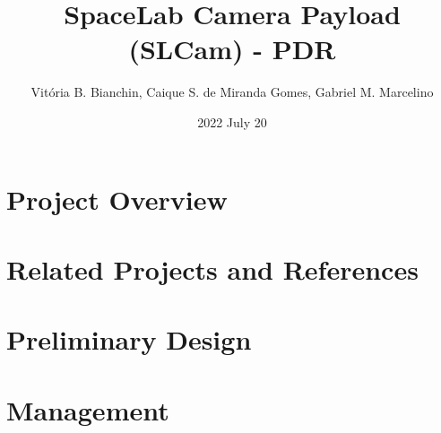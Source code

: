 \documentclass{beamer}
\title[Presentation]{SpaceLab Camera Payload (SLCam) - PDR}
\author[SpaceLab]{Vitória B. Bianchin, Caique S. de Miranda Gomes, Gabriel M. Marcelino}
\institute[]{SpaceLab - UFSC}
\date{2022 July 20}
\begin{document}
    
    

    \section{Project Overview}

        

    \section{Related Projects and References}

        

    \section{Preliminary Design}

        

    \section{Management}

        

\end{document}
